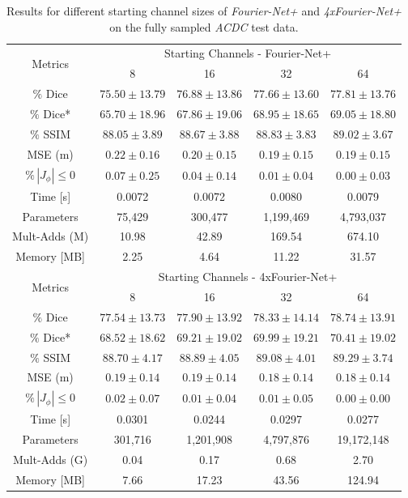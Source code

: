 \begin{table}[h] %
	\centering
	\caption{Results for different starting channel sizes of \emph{Fourier-Net+} and \emph{4xFourier-Net+} on the fully sampled \emph{ACDC} test data.}
	\label{tab:StartingChannelsFourierNet+ACDC}
	\begin{tabular}{c c c c c} %
		\toprule
		\multirow{2}{*}{Metrics} & \multicolumn{4}{c}{Starting Channels - Fourier-Net+} \\
		\cmidrule(lr){2-5}
		 & 8 & 16 & 32 & 64 \\		
		\midrule
		$\%$ Dice & $75.50 \pm 13.79$ & $76.88 \pm 13.86$ & $77.66 \pm 13.60$ & $77.81 \pm 13.76$ \\
		$\%$ Dice* & $65.70 \pm 18.96$ & $67.86 \pm 19.06$ & $68.95 \pm 18.65$ & $69.05 \pm 18.80$ \\
		$\%$ SSIM & $88.05 \pm 3.89$ & $88.67 \pm 3.88$ & $88.83 \pm 3.83$ & $89.02 \pm 3.67$ \\
		MSE (m) & $0.22 \pm 0.16$ & $0.20 \pm 0.15$ & $0.19 \pm 0.15$ & $0.19 \pm 0.15$ \\
		$\% \, |J_{\phi}|\leq0$ & $0.07 \pm 0.25$ & $0.04 \pm 0.14$ & $0.01 \pm 0.04$ & $0.00 \pm 0.03$ \\
		Time [s] 	  & 0.0072 & 0.0072 & 0.0080 & 0.0079 \\
		Parameters 	  & 75,429 	& 300,477 	& 1,199,469 	& 4,793,037 \\
		Mult-Adds (M) & 10.98 	& 42.89 		& 169.54 	& 674.10 \\
		Memory [MB] 	  & 2.25 	& 4.64 		& 11.22 		& 31.57 \\
		\midrule		
		\multirow{2}{*}{Metrics} & \multicolumn{4}{c}{Starting Channels - 4xFourier-Net+} \\
		\cmidrule(lr){2-5} 
		 & 8 & 16 & 32 & 64 \\		
		\midrule
		$\%$ Dice & $77.54 \pm 13.73$ & $77.90 \pm 13.92$ & $78.33 \pm 14.14$ & $78.74 \pm 13.91$ \\
		$\%$ Dice* & $68.52 \pm 18.62$ & $69.21 \pm 19.02$ & $69.99 \pm 19.21$ & $70.41 \pm 19.02$ \\
		$\%$ SSIM & $88.70 \pm 4.17$ & $88.89 \pm 4.05$ & $89.08 \pm 4.01$ & $89.29 \pm 3.74$ \\
		MSE (m) & $0.19 \pm 0.14$ & $0.19 \pm 0.14$ & $0.18 \pm 0.14$ & $0.18 \pm 0.14$ \\
		$\% \, |J_{\phi}|\leq0$ & $0.02 \pm 0.07$ & $0.01 \pm 0.04$ & $0.01 \pm 0.05$ & $0.00 \pm 0.00$ \\
		Time [s] 	  & 0.0301 	& 0.0244 	& 0.0297 	& 0.0277 \\
		Parameters 	  & 301,716 	& 1,201,908 	& 4,797,876 	& 19,172,148 \\
		Mult-Adds (G) & 0.04 	& 0.17 		& 0.68 		& 2.70 \\
		Memory [MB] 	  & 7.66 	& 17.23 		& 43.56 		& 124.94 \\
		\bottomrule
	\end{tabular}	
\end{table}


